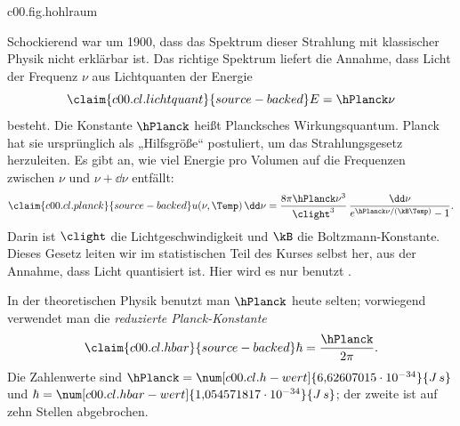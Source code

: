 \begin{tpcfigure}{c00.fig.hohlraum}
  \caption{Ein Schwarzkörper als Kiste mit kleinem Loch. Gezeichnet sind die ersten
    Reflexionen eines eintretenden Strahls nach dem Reflexionsgesetz; keine davon trifft
    das Loch. Behält die Wand bei jeder Reflexion den Bruchteil $1 - r$ der Energie, so
    ist nach $n$ Reflexionen nur noch der Bruchteil $r^n$ übrig,
    Gleichung~\eqref{c00.eq.reflexion}.}
\end{tpcfigure}

Schockierend war um 1900, dass das Spektrum dieser Strahlung mit klassischer Physik nicht
erklärbar ist. Das richtige Spektrum liefert die Annahme, dass Licht der Frequenz $\nu$ aus
Lichtquanten der Energie
\begin{equation}\label{c00.eq.lichtquant}\claim{c00.cl.lichtquant}{source-backed}
  E = \hPlanck \nu
\end{equation}
besteht. Die Konstante $\hPlanck$ heißt Plancksches Wirkungsquantum. Planck hat sie
ursprünglich als „Hilfsgröße“ postuliert, um das Strahlungsgesetz herzuleiten. Es gibt an,
wie viel Energie pro Volumen auf die Frequenzen zwischen $\nu$ und $\nu + \dd\nu$
entfällt:
\begin{equation}\label{c00.eq.planck}\claim{c00.cl.planck}{source-backed}
  u(\nu, \Temp)\,\dd\nu
  = \frac{8\pi \hPlanck \nu^3}{\clight^3}\,\frac{\dd\nu}{e^{\hPlanck\nu/(\kB \Temp)} - 1} .
\end{equation}
Darin ist $\clight$ die Lichtgeschwindigkeit und $\kB$ die Boltzmann-Konstante. Dieses Gesetz
leiten wir im statistischen Teil des Kurses selbst her, aus der Annahme, dass Licht
quantisiert ist. Hier wird es nur benutzt
.

In der theoretischen Physik benutzt man $\hPlanck$ heute selten; vorwiegend verwendet man
die \emph{reduzierte Planck-Konstante}
\begin{equation}\label{c00.eq.hbar}\claim{c00.cl.hbar}{source-backed}
  \hbar = \frac{\hPlanck}{2\pi} .
\end{equation}
Die Zahlenwerte sind
$\hPlanck = \num[c00.cl.h-wert]{6{,}62607015 \cdot 10^{-34}}{J\,s}$ und
$\hbar = \num[c00.cl.hbar-wert]{1{,}054571817 \cdot 10^{-34}}{J\,s}$; der zweite ist auf
zehn Stellen abgebrochen.

